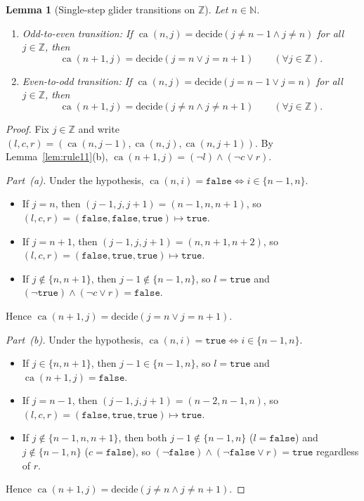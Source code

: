 \documentclass[11pt]{article}
\newtheorem{lemma}[theorem]{Lemma}
\theoremstyle{definition}
\newcommand{\N}{\mathbb{N}}
\newcommand{\Z}{\mathbb{Z}}
\newcommand{\ca}{\operatorname{ca}}
\begin{document}
\begin{lemma}[Single-step glider transitions on $\Z$]
\label{lem:glider-steps}
Let $n \in \N$.
\begin{enumerate}
\item[\textup{(a)}] \emph{Odd-to-even transition:} If $\ca(n, j) = \mathrm{decide}(j \ne n - 1 \land j \ne n)$ for all $j \in \Z$, then
\[
\ca(n + 1, j) = \mathrm{decide}(j = n \lor j = n + 1) \qquad (\forall j \in \Z).
\]
\item[\textup{(b)}] \emph{Even-to-odd transition:} If $\ca(n, j) = \mathrm{decide}(j = n - 1 \lor j = n)$ for all $j \in \Z$, then
\[
\ca(n + 1, j) = \mathrm{decide}(j \ne n \land j \ne n + 1) \qquad (\forall j \in \Z).
\]
\end{enumerate}
\end{lemma}

\begin{proof}
Fix $j \in \Z$ and write $(l, c, r) = (\ca(n, j - 1), \ca(n, j), \ca(n, j + 1))$. By Lemma~\ref{lem:rule11}(b), $\ca(n + 1, j) = (\neg l) \land (\neg c \lor r)$.

\emph{Part~(a).} Under the hypothesis, $\ca(n, i) = \mathtt{false} \iff i \in \{n - 1, n\}$.
\begin{itemize}
\item If $j = n$, then $(j - 1, j, j + 1) = (n - 1, n, n + 1)$, so $(l, c, r) = (\mathtt{false}, \mathtt{false}, \mathtt{true}) \mapsto \mathtt{true}$.
\item If $j = n + 1$, then $(j - 1, j, j + 1) = (n, n + 1, n + 2)$, so $(l, c, r) = (\mathtt{false}, \mathtt{true}, \mathtt{true}) \mapsto \mathtt{true}$.
\item If $j \notin \{n, n + 1\}$, then $j - 1 \notin \{n - 1, n\}$, so $l = \mathtt{true}$ and $(\neg \mathtt{true}) \land (\neg c \lor r) = \mathtt{false}$.
\end{itemize}
Hence $\ca(n + 1, j) = \mathrm{decide}(j = n \lor j = n + 1)$.

\emph{Part~(b).} Under the hypothesis, $\ca(n, i) = \mathtt{true} \iff i \in \{n - 1, n\}$.
\begin{itemize}
\item If $j \in \{n, n + 1\}$, then $j - 1 \in \{n - 1, n\}$, so $l = \mathtt{true}$ and $\ca(n + 1, j) = \mathtt{false}$.
\item If $j = n - 1$, then $(j - 1, j, j + 1) = (n - 2, n - 1, n)$, so $(l, c, r) = (\mathtt{false}, \mathtt{true}, \mathtt{true}) \mapsto \mathtt{true}$.
\item If $j \notin \{n - 1, n, n + 1\}$, then both $j - 1 \notin \{n - 1, n\}$ ($l = \mathtt{false}$) and $j \notin \{n - 1, n\}$ ($c = \mathtt{false}$), so $(\neg \mathtt{false}) \land (\neg \mathtt{false} \lor r) = \mathtt{true}$ regardless of $r$.
\end{itemize}
Hence $\ca(n + 1, j) = \mathrm{decide}(j \ne n \land j \ne n + 1)$.
\end{proof}
\end{document}
